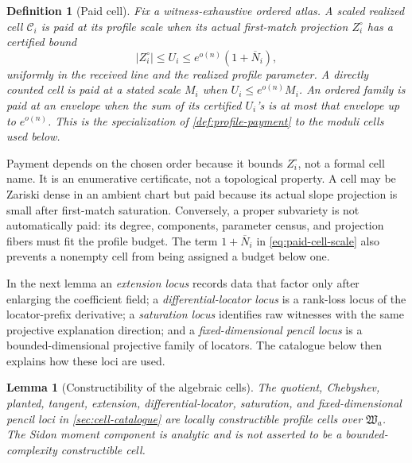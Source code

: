 \documentclass[12pt,a4paper]{amsart}
\numberwithin{equation}{section}
\newtheorem{lemma}[lemma]{Lemma}
\newtheorem{definition}[definition]{Definition}
\theoremstyle{remark}
\newcommand{\Ccal}{\mathcal C}
\newcommand{\barN}{\overline N}
\newcommand{\abs}[1]{\lvert #1\rvert}
\begin{document}
\begin{definition}[Paid cell]\label{def:paid-cell}
Fix a witness-exhaustive ordered atlas.  A scaled realized cell \(\Ccal_i\)
is \emph{paid at its profile scale} when its actual first-match projection
\(Z_i^\circ\) has a certified bound
\[
       \abs{Z_i^\circ}\le U_i
          \le e^{o(n)}(1+\barN_i),
 \tag{5.1}\label{eq:paid-cell-scale}
\]
uniformly in the received line and the realized profile parameter.  A
directly counted cell is paid at a stated scale \(M_i\) when
\(U_i\le e^{o(n)}M_i\).  An ordered family is paid at an envelope when
the sum of its certified \(U_i\)'s is at most that envelope up to
\(e^{o(n)}\).  This is the specialization of
\cref{def:profile-payment} to the moduli cells used below.
\end{definition}

Payment depends on the chosen order because it bounds \(Z_i^\circ\), not a
formal cell name.  It is an enumerative certificate, not a topological
property.  A cell may be Zariski dense in an ambient chart but paid because
its actual slope projection is small after first-match saturation.
Conversely, a proper subvariety is not automatically paid: its degree,
components, parameter census, and projection fibers must fit the profile
budget.  The term \(1+\barN_i\) in \eqref{eq:paid-cell-scale} also prevents
a nonempty cell from being assigned a budget below one.

In the next lemma an \emph{extension locus} records data that factor only
after enlarging the coefficient field; a \emph{differential-locator
locus} is a rank-loss locus of the locator-prefix derivative; a
\emph{saturation locus} identifies raw witnesses with the same projective
explanation direction; and a \emph{fixed-dimensional pencil locus} is a
bounded-dimensional projective family of locators.  The catalogue below
then explains how these loci are used.

\begin{lemma}[Constructibility of the algebraic cells]\label{lem:constructible-cells}
The quotient, Chebyshev, planted, tangent, extension, differential-locator,
saturation, and fixed-dimensional pencil loci in
\cref{sec:cell-catalogue} are locally constructible profile cells over
\(\mathfrak W_a\).
The Sidon moment component is analytic and is not asserted to be a
bounded-complexity constructible cell.
\end{lemma}
\end{document}
